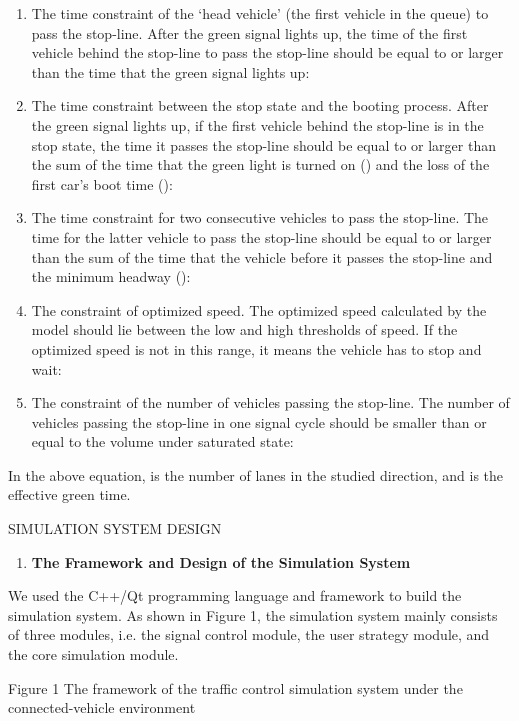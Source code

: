 \begin{enumerate}
\def\labelenumi{\alph{enumi})}
\item
  The time constraint of the `head vehicle' (the first vehicle in the
  queue) to pass the stop-line. After the green signal lights up, the
  time of the first vehicle behind the stop-line to pass the stop-line
  should be equal to or larger than the time that the green signal
  lights up:
\item
  The time constraint between the stop state and the booting process.
  After the green signal lights up, if the first vehicle behind the
  stop-line is in the stop state, the time it passes the stop-line
  should be equal to or larger than the sum of the time that the green
  light is turned on () and the loss of the first car's boot time ():
\item
  The time constraint for two consecutive vehicles to pass the
  stop-line. The time for the latter vehicle to pass the stop-line
  should be equal to or larger than the sum of the time that the vehicle
  before it passes the stop-line and the minimum headway ():
\item
  The constraint of optimized speed. The optimized speed calculated by
  the model should lie between the low and high thresholds of speed. If
  the optimized speed is not in this range, it means the vehicle has to
  stop and wait:
\item
  The constraint of the number of vehicles passing the stop-line. The
  number of vehicles passing the stop-line in one signal cycle should be
  smaller than or equal to the volume under saturated state:
\end{enumerate}

In the above equation, is the number of lanes in the studied direction,
and is the effective green time.

SIMULATION SYSTEM DESIGN

\begin{enumerate}
\def\labelenumi{\arabic{enumi}.}
\item
  \textbf{The Framework and Design of the Simulation System}
\end{enumerate}

We used the C++/Qt programming language and framework to build the
simulation system. As shown in Figure 1, the simulation system mainly
consists of three modules, i.e. the signal control module, the user
strategy module, and the core simulation module.

Figure 1 The framework of the traffic control simulation system under
the connected-vehicle environment

